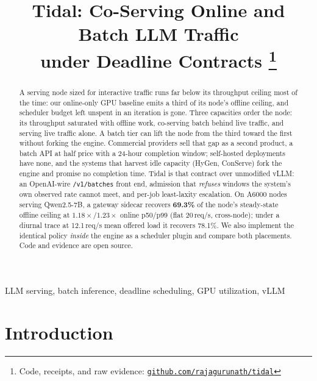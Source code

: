 \documentclass[conference]{IEEEtran}
\newcommand{\code}[1]{\texttt{#1}}
\begin{document}
\title{Tidal: Co-Serving Online and Batch LLM Traffic\\ under Deadline Contracts%
\thanks{Code, receipts, and raw evidence:
\href{https://github.com/rajagurunath/tidal}{\code{github.com/\discretionary{}{}{}rajagurunath/\discretionary{}{}{}tidal}}}}

\author{
}

\maketitle

\begin{abstract}
A serving node sized for interactive traffic runs far below its throughput ceiling
most of the time: our online-only GPU baseline emits a third of its node's offline
ceiling, and scheduler budget left unspent in an iteration is gone. Three capacities order the node:
its throughput saturated with offline work, co-serving batch behind live traffic, and
serving live traffic alone. A batch tier can lift the node from the third toward the
first without forking the engine. Commercial providers sell that gap as a second product,
a batch API at half price with a 24-hour completion window; self-hosted deployments have
none, and the systems that harvest idle capacity (HyGen, ConServe) fork the engine and
promise no completion time. Tidal is that contract over unmodified vLLM: an OpenAI-wire
\code{/v1/batches} front end, admission that \emph{refuses} windows the system's own
observed rate cannot meet, and per-job least-laxity escalation. On A6000 nodes serving
Qwen2.5-7B, a gateway sidecar recovers \textbf{69.3\%} of the node's steady-state offline
ceiling at $1.18\times$/$1.23\times$ online p50/p99 (flat 20\,req/s, cross-node); under a
diurnal trace at 12.1\,req/s mean offered load it recovers 78.1\%. We also implement the
identical policy \emph{inside} the engine as a scheduler plugin and compare both
placements. Code and evidence are open source.
\end{abstract}

\begin{IEEEkeywords}
LLM serving, batch inference, deadline scheduling, GPU utilization, vLLM
\end{IEEEkeywords}

\section{Introduction}
\end{document}

